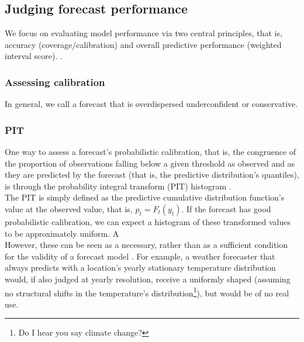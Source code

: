 \subsection{Judging forecast performance}
We focus on evaluating model performance via two central principles, that is, accuracy (coverage/calibration) and overall predictive performance (weighted interval score). \citep{sherratt_predictive_2022}.
\subsubsection{Assessing calibration}
In general, we call a forecast that is overdispersed underconfident or conservative.
\subsubsection{PIT}
One way to assess a forecast's probabilistic calibration, that is, the congruence of the proportion of observations falling below a given threshold as observed and as they are predicted by the forecast (that is, the predictive distribution's quantiles), is through the probability integral transform (PIT) histogram \citep{dawid_present_1984}.  \\
The PIT is simply defined as the predictive cumulative distribution function's value at the observed value, that is, $p_t = F_t(y_t)$. If the forecast has good probabilistic calibration, we can expect a histogram of these transformed values to be approximately uniform. A \\
However, these can be seen as a necessary, rather than as a sufficient condition for the validity of a forecast model \cite{gneiting_probabilistic_2007}. For example, a weather forecaster that always predicts with a location's yearly stationary temperature distribution would, if also judged at yearly resolution, receive a uniformly shaped (assuming no structural shifts in the temperature's distribution\footnote{Do I hear you say climate change?}), but would be of no real use.
